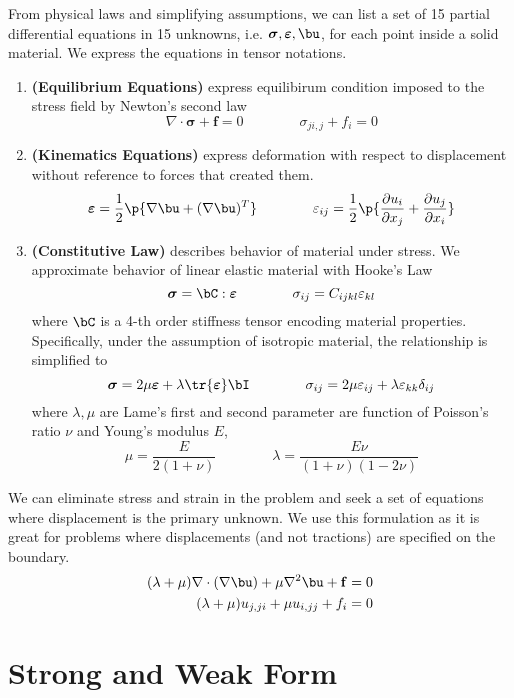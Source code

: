 \documentclass[11pt]{article}
\newcommand{\bheading}[1]{\textbf{(#1)}}
\newcommand{\bsigma}{\boldsymbol{\sigma}}
\newcommand{\bepsilon}{\boldsymbol{\varepsilon}}
\renewcommand{\epsilon}{\varepsilon}
\renewcommand{\bf}{\mathbf{f}}
\begin{document}
From physical laws and simplifying assumptions, we can list a set of 15 partial differential equations in 15 unknowns, i.e. $\bsigma, \bepsilon, \bu$, for each point inside a solid material. We express the equations in tensor notations.
\begin{enumerate}
    \item \bheading{Equilibrium Equations} express equilibirum condition imposed to the stress field by Newton's second law
    \[
        \nabla\cdot\bsigma + \bf = 0
        \quad\quad\quad\quad
        \sigma_{ji,j} + f_i = 0
    \]
    \item \bheading{Kinematics Equations} express deformation with respect to displacement without reference to forces that created them. 
    \[
        \bepsilon = \dfrac{1}{2} \p{
            \nabla \bu + (\nabla\bu)^T
        }
        \quad\quad\quad\quad
        \epsilon_{ij} = 
            \frac{1}{2} \p{
                \frac{\partial u_i}{\partial x_j} + \frac{\partial u_j}{\partial x_i}}
    \]
    \item \bheading{Constitutive Law} describes behavior of material under stress. We approximate behavior of linear elastic material with Hooke's Law
    \[
        \bsigma = \bC : \bepsilon
        \quad\quad\quad\quad
        \sigma_{ij} = C_{ijkl} \epsilon_{kl}
    \]
    where $\bC$ is a 4-th order stiffness tensor encoding material properties. Specifically, under the assumption of isotropic material, the relationship is simplified to 
    \[
        \bsigma = 2\mu\bepsilon + \lambda \tr{\bepsilon} \bI
        \quad\quad\quad\quad
        \sigma_{ij} = 2\mu \epsilon_{ij} + \lambda \epsilon_{kk} \delta_{ij}
    \]
    where $\lambda,\mu$ are Lame's first and second parameter are function of Poisson's ratio $\nu$ and Young's modulus $E$,
    \[
        \mu = \frac{E}{2(1+\nu)}
        \quad\quad\quad\quad
        \lambda = \frac{E\nu}{(1+\nu)(1-2\nu)}
    \]
\end{enumerate}
We can eliminate stress and strain in the problem and seek a set of equations where displacement is the primary unknown. We use this formulation as it is great for problems where displacements (and not tractions) are specified on the boundary.
\begin{align*}
    (\lambda+\mu) \nabla \cdot(\nabla \bu) + \mu \nabla^2 \bu + \bf &= 0 \\
    (\lambda+\mu)u_{j,ji} + \mu u_{i,jj} + f_i &= 0
\end{align*}

\section*{Strong and Weak Form}
\end{document}
